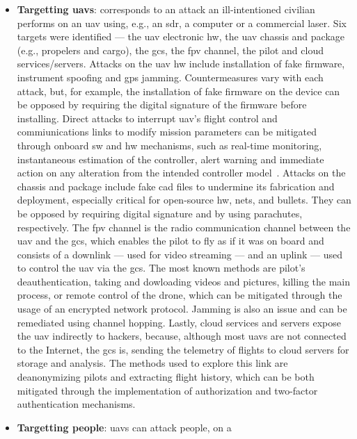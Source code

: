 \begin{itemize}
\item \textbf{Targetting \glspl{uav}}: corresponds to an attack an
  ill-intentioned civilian performs on an \gls{uav} using, e.g., an \gls{sdr}, a
  computer or a commercial laser. Six targets were identified --- the \gls{uav}
  electronic \gls{hw}, the \gls{uav} chassis and package (e.g., propelers and
  cargo), the \gls{gcs}, the \gls{fpv} channel, the pilot and cloud
  services/servers. Attacks on the \gls{uav} \gls{hw} include installation of
  fake firmware, instrument spoofing and \gls{gps} jamming. Countermeasures vary
  with each attack, but, for example, the installation of fake firmware on the
  device can be opposed by requiring the digital signature of the firmware
  before installing. Direct attacks to interrupt \gls{uav}'s flight control and
  commiunications links to modify mission parameters can be mitigated through
  onboard \gls{sw} and \gls{hw} mechanisms, such as real-time monitoring,
  instantaneous estimation of the controller, alert warning and immediate action
  on any alteration from the intended controller model~\cite{mohsan2022towards}.
  Attacks on the chassis and package include fake \gls{cad}
  files to undermine its fabrication and deployment, especially critical for
  open-source \gls{hw}, nets, and bullets. They can be opposed by requiring
  digital signature and by using parachutes, respectively.
  The \gls{fpv} channel is the radio communication channel between the \gls{uav}
  and the \gls{gcs}, which enables the pilot to fly as if it was on board and
  consists of a downlink --- used for video streaming --- and an uplink --- used
  to control the \gls{uav} via the \gls{gcs}. The most known methods are
  pilot's deauthentication, taking and dowloading videos and pictures, killing
  the main process, or remote control of the drone, which can be mitigated
  through the usage of an encrypted network protocol. Jamming is also an issue
  and can be remediated using channel hopping. Lastly, cloud services and
  servers expose the \gls{uav} indirectly to hackers, because, although most
  \glspl{uav} are not connected to the Internet, the \gls{gcs} is, sending the
  telemetry of flights to cloud servers for storage and analysis. The methods
  used to explore this link are deanonymizing pilots and extracting flight
  history, which can be both mitigated through the implementation of
  authorization and two-factor authentication mechanisms.
\item \textbf{Targetting people}: \glspl{uav} can attack people, on a

\end{itemize}
